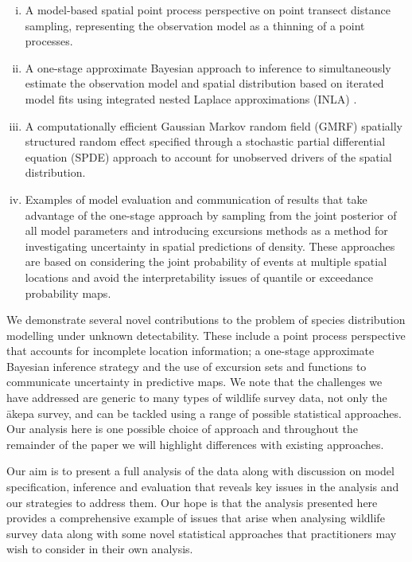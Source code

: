 \documentclass[preprint,12pt]{elsarticle}
\newcommand{\akepa}{\textquotesingle\={a}kepa}  %
\begin{document}
\begin{enumerate}[(i)]
	\item A model-based spatial point process perspective on point transect distance sampling, representing the observation model as a thinning of a point processes.
	\item A one-stage approximate Bayesian approach to inference to simultaneously estimate the observation model and spatial distribution based on iterated model fits using integrated nested Laplace approximations (INLA) \citep{rue_approximate_2009}.
	\item A computationally efficient Gaussian Markov random field (GMRF) spatially structured random effect specified through a stochastic partial differential equation (SPDE) approach \citep{lindgren_explicit_2011} to account for unobserved drivers of the spatial distribution.
	\item Examples of model evaluation and communication of results that take advantage of the one-stage approach by sampling from the joint posterior of all model parameters and introducing excursions methods \citep{bolin_excursion_2015} as a method for investigating uncertainty in spatial predictions of density.  These approaches are based on considering the joint probability of events at multiple spatial locations and avoid the interpretability issues of quantile or exceedance probability maps.
\end{enumerate}

We demonstrate several novel contributions to the problem of species distribution modelling under unknown detectability.  These include a point process perspective that accounts for incomplete location information; a one-stage approximate Bayesian inference strategy and the use of excursion sets and functions to communicate uncertainty in predictive maps.  We note that the challenges we have addressed are generic to many types of wildlife survey data, not only the \akepa{} survey, and can be tackled using a range of possible statistical approaches.  Our analysis here is one possible choice of approach and throughout the remainder of the paper we will highlight differences with existing approaches.

Our aim is to present a full analysis of the data along with discussion on model specification, inference and evaluation that reveals key issues in the analysis and our strategies to address them.  Our hope is that the analysis presented here provides a comprehensive example of issues that arise when analysing wildlife survey data along with some novel statistical approaches that practitioners may wish to consider in their own analysis.
\end{document}
